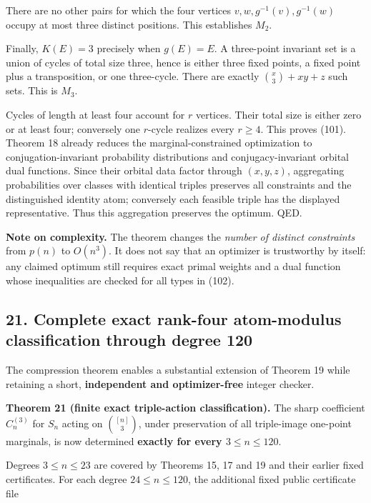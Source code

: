 \documentclass[
  11pt,
]{article}
\begin{document}
There are no other pairs for which the four vertices
\(v,w,g^{-1}(v),g^{-1}(w)\) occupy at most three distinct positions.
This establishes \(M_2\).

Finally, \(K(E)=3\) precisely when \(g(E)=E\). A three-point invariant
set is a union of cycles of total size three, hence is either three
fixed points, a fixed point plus a transposition, or one three-cycle.
There are exactly \(\binom x3+xy+z\) such sets. This is \(M_3\).

Cycles of length at least four account for \(r\) vertices. Their total
size is either zero or at least four; conversely one \(r\)-cycle
realizes every \(r\ge4\). This proves (101). Theorem 18 already reduces
the marginal-constrained optimization to conjugation-invariant
probability distributions and conjugacy-invariant orbital dual
functions. Since their orbital data factor through \((x,y,z)\),
aggregating probabilities over classes with identical triples preserves
all constraints and the distinguished identity atom; conversely each
feasible triple has the displayed representative. Thus this aggregation
preserves the optimum. QED.

\textbf{Note on complexity.} The theorem changes the \emph{number of
distinct constraints} from \(p(n)\) to \(O(n^3)\). It does not say that
an optimizer is trustworthy by itself: any claimed optimum still
requires exact primal weights and a dual function whose inequalities are
checked for all types in (102).

\subsection{21. Complete exact rank-four atom-modulus classification
through degree
120}\label{complete-exact-rank-four-atom-modulus-classification-through-degree-120}

The compression theorem enables a substantial extension of Theorem 19
while retaining a short, \textbf{independent and optimizer-free} integer
checker.

\textbf{Theorem 21 (finite exact triple-action classification).} The
sharp coefficient \(C_n^{(3)}\) for \(S_n\) acting on \(\binom{[n]}3\),
under preservation of all triple-image one-point marginals, is now
determined \textbf{exactly for every \(3\le n\le120\)}.

Degrees \(3\le n\le23\) are covered by Theorems 15, 17 and 19 and their
earlier fixed certificates. For each degree \(24\le n\le120\), the
additional fixed public certificate file
\end{document}
